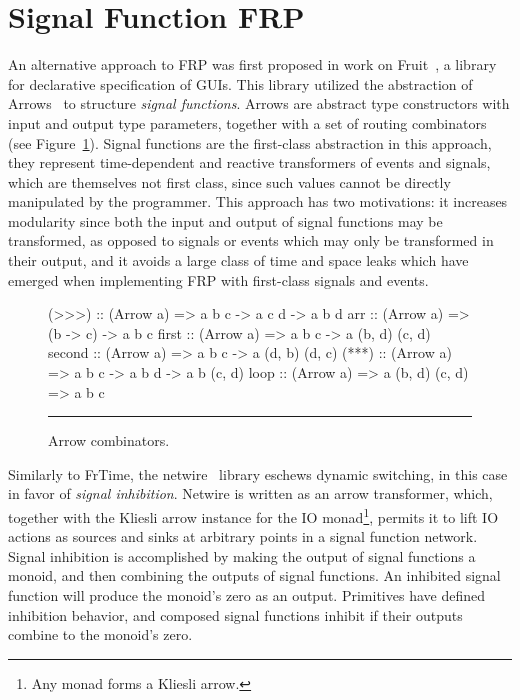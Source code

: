 \section{Signal Function FRP}
\label{section:Background-signal_function_frp}

An alternative approach to FRP was first proposed in work on
Fruit~\cite{Courtney2001-1}, a library for declarative specification of GUIs.
This library utilized the abstraction of Arrows~\cite{Hughes2000} to structure
{\em signal functions}. Arrows are abstract type constructors with input and
output type parameters, together with a set of routing combinators (see Figure~\ref{figure:arrow_combinators}).
Signal functions are the first-class
abstraction in this approach, they represent time-dependent and reactive
transformers of events and signals,  which are themselves not first class,
since such values cannot be directly manipulated by the programmer. This
approach has two motivations: it increases modularity since both the input and
output of signal functions may be transformed, as opposed to signals or events
which may only be transformed in their output, and it avoids a large class of
time and space leaks which have emerged when implementing FRP with first-class
signals and events.

\begin{figure}
\begin{code}
(>>>)  :: (Arrow a) => a b c -> a c d -> a b d
arr    :: (Arrow a) => (b -> c) -> a b c
first  :: (Arrow a) => a b c -> a (b, d) (c, d)
second :: (Arrow a) => a b c -> a (d, b) (d, c)
(***)  :: (Arrow a) => a b c -> a b d -> a b (c, d)
loop   :: (Arrow a) => a (b, d) (c, d) => a b c
\end{code}
\hrule
\caption{Arrow combinators.}
\label{figure:arrow_combinators}
\end{figure}

Similarly to FrTime, the netwire~\cite{Soylemez} library eschews dynamic
switching, in this case in favor of {\em signal inhibition}. Netwire is written
as an arrow transformer, which, together with the Kliesli arrow instance for the
IO monad\footnote{Any monad forms a Kliesli arrow.}, permits it to lift IO
actions as sources and sinks at arbitrary points in a signal function network.
Signal inhibition is accomplished by making the output of signal functions a
monoid, and then combining the outputs of signal functions. An inhibited signal
function will produce the monoid's zero as an output. Primitives have defined
inhibition behavior, and composed signal functions inhibit if their outputs
combine to the monoid's zero.

